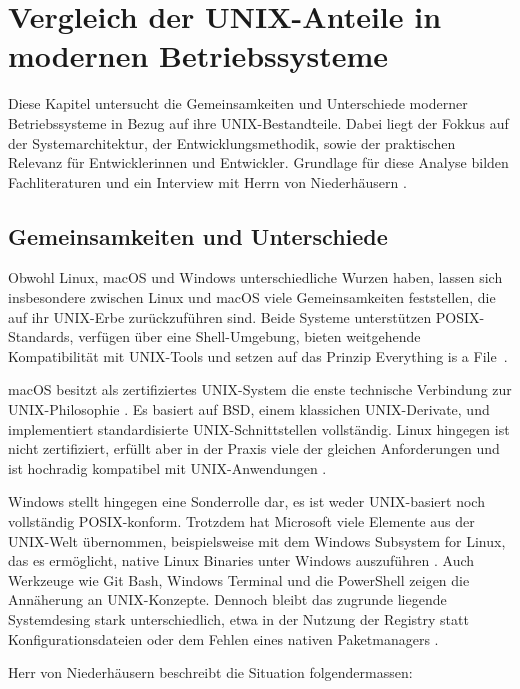 \section{Vergleich der UNIX-Anteile in modernen Betriebssysteme}

Diese Kapitel untersucht die Gemeinsamkeiten und Unterschiede moderner Betriebssysteme in Bezug auf ihre UNIX-Bestandteile. Dabei liegt der Fokkus auf der
Systemarchitektur, der Entwicklungsmethodik, sowie der praktischen Relevanz für Entwicklerinnen und Entwickler. Grundlage für diese Analyse bilden Fachliteraturen
und ein Interview mit Herrn von Niederhäusern \cite{interviewNH}.


\subsection{Gemeinsamkeiten und Unterschiede}

Obwohl Linux, macOS und Windows unterschiedliche Wurzen haben, lassen sich insbesondere zwischen Linux und macOS viele Gemeinsamkeiten feststellen, die auf ihr
UNIX-Erbe zurückzuführen sind. Beide Systeme unterstützen POSIX-Standards, verfügen über eine Shell-Umgebung, bieten weitgehende Kompatibilität mit UNIX-Tools und
setzen auf das Prinzip \glqq Everything is a File\grqq \ \cite{ArtOfUnixProgramming, ModernOS, OSConcept}.

macOS besitzt als zertifiziertes UNIX-System die enste technische Verbindung zur UNIX-Philosophie \cite{FreeBSDOS}. Es basiert auf BSD, einem klassichen
UNIX-Derivate, und implementiert standardisierte UNIX-Schnittstellen vollständig. Linux hingegen ist nicht zertifiziert, erfüllt aber in der Praxis viele der
gleichen Anforderungen und ist hochradig kompatibel mit UNIX-Anwendungen \cite{ModernOS, OSConcept}.

Windows stellt hingegen eine Sonderrolle dar, es ist weder UNIX-basiert noch vollständig POSIX-konform. Trotzdem hat Microsoft viele Elemente aus der UNIX-Welt
übernommen, beispielsweise mit dem Windows Subsystem for Linux, das es ermöglicht, native Linux Binaries unter Windows auszuführen \cite{WSL}. Auch Werkzeuge
wie Git Bash, Windows Terminal und die PowerShell zeigen die Annäherung an UNIX-Konzepte. Dennoch bleibt das zugrunde liegende Systemdesing stark unterschiedlich,
etwa in der Nutzung der Registry statt Konfigurationsdateien oder dem Fehlen eines nativen Paketmanagers \cite{interviewNH}.

Herr von Niederhäusern beschreibt die Situation folgendermassen: %


